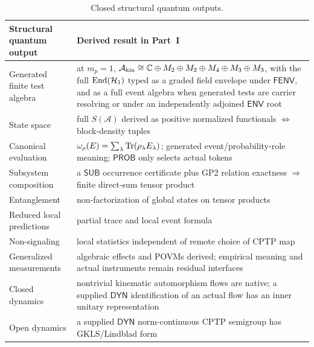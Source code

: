\documentclass[12pt,a4paper]{article}
\begin{document}
\begin{table}[!htbp]
\centering
\caption[Closed structural quantum outputs]{Closed structural quantum outputs.}
\label{p4:tab:structural-outputs}
\renewcommand{\arraystretch}{1.2}
\begin{tabularx}{\textwidth}{>{\raggedright\arraybackslash}p{}
                                >{\raggedright\arraybackslash}X}
\toprule
\textbf{Structural quantum output} & \textbf{Derived result in Part~I} \\
\midrule
Generated finite test algebra & at \(m_p=1\), \(\mathcal A_{\rm kin}\cong
\mathbb C\oplus M_2\oplus M_2\oplus M_4\oplus M_3\oplus M_3\), with
the full \(\operatorname{End}(\mathcal H_1)\) typed as a graded field envelope under
\(\mathsf{FENV}\), and as a full event algebra when generated tests are
carrier resolving or under an independently adjoined \(\mathsf{ENV}\) root \\

State space & full \(S(\mathcal A)\) derived as positive normalized
functionals \(\Leftrightarrow\) block-density tuples \\

Canonical evaluation & \(\omega_\rho(E)=\sum_\lambda\operatorname{Tr}(\rho_\lambda E_\lambda)\);
generated event/probability-role meaning; \(\mathsf{PROB}\) only selects actual tokens \\

Subsystem composition & a \(\mathsf{SUB}\) occurrence certificate plus GP2
relation exactness \(\Rightarrow\) finite direct-sum tensor product \\

Entanglement & non-factorization of global states on tensor products \\

Reduced local predictions & partial trace and local event formula \\

Non-signaling & local statistics independent of remote choice of CPTP map \\

Generalized measurements & algebraic effects and POVMs derived; empirical
meaning and actual instruments remain residual interfaces \\

Closed dynamics & nontrivial kinematic automorphism flows are native; a
supplied \(\mathsf{DYN}\) identification of an actual flow has an inner
unitary representation \\

Open dynamics & a supplied \(\mathsf{DYN}\) norm-continuous CPTP semigroup has GKLS/Lindblad form \\


\end{tabularx}
\end{table}
\end{document}
